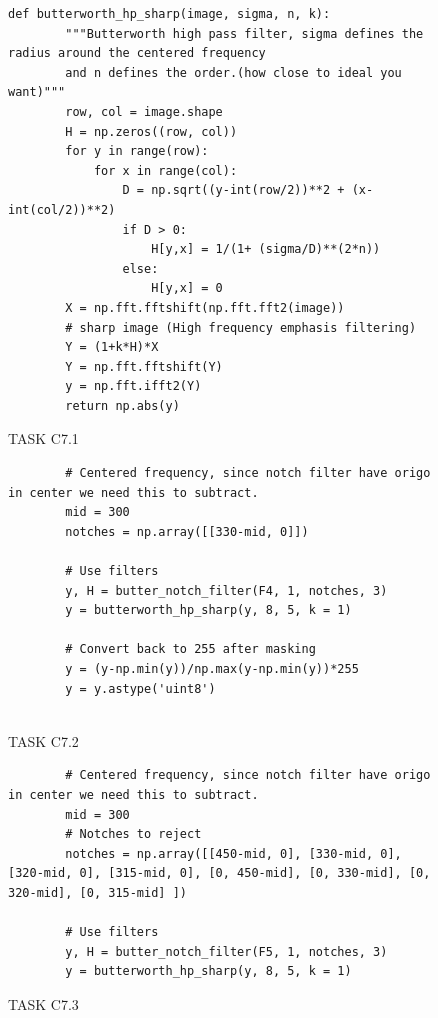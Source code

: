 {\begin{figure}[H]
\begin{lstlisting}
def butterworth_hp_sharp(image, sigma, n, k):
        """Butterworth high pass filter, sigma defines the radius around the centered frequency
        and n defines the order.(how close to ideal you want)"""
        row, col = image.shape
        H = np.zeros((row, col))
        for y in range(row):
            for x in range(col):
                D = np.sqrt((y-int(row/2))**2 + (x-int(col/2))**2)
                if D > 0:
                    H[y,x] = 1/(1+ (sigma/D)**(2*n))
                else:
                    H[y,x] = 0
        X = np.fft.fftshift(np.fft.fft2(image))
        # sharp image (High frequency emphasis filtering)
        Y = (1+k*H)*X
        Y = np.fft.fftshift(Y)
        y = np.fft.ifft2(Y)
        return np.abs(y)

    \end{lstlisting}
\caption{TASK C7.1}
\label{TASK C7.1}
\end{figure}




\begin{figure}[H]
    \begin{lstlisting}
        # Centered frequency, since notch filter have origo in center we need this to subtract.
        mid = 300 
        notches = np.array([[330-mid, 0]])
        
        # Use filters
        y, H = butter_notch_filter(F4, 1, notches, 3)
        y = butterworth_hp_sharp(y, 8, 5, k = 1)
        
        # Convert back to 255 after masking
        y = (y-np.min(y))/np.max(y-np.min(y))*255
        y = y.astype('uint8')
        
    \end{lstlisting}
\caption{TASK C7.2}
\label{TASK C7.2}
\end{figure}


\begin{figure}[H]
    \begin{lstlisting}
        # Centered frequency, since notch filter have origo in center we need this to subtract.
        mid = 300 
        # Notches to reject
        notches = np.array([[450-mid, 0], [330-mid, 0], [320-mid, 0], [315-mid, 0], [0, 450-mid], [0, 330-mid], [0, 320-mid], [0, 315-mid] ])
        
        # Use filters
        y, H = butter_notch_filter(F5, 1, notches, 3)
        y = butterworth_hp_sharp(y, 8, 5, k = 1)
    \end{lstlisting}
\caption{TASK C7.3}
\label{TASK C7.3}
\end{figure}



}
